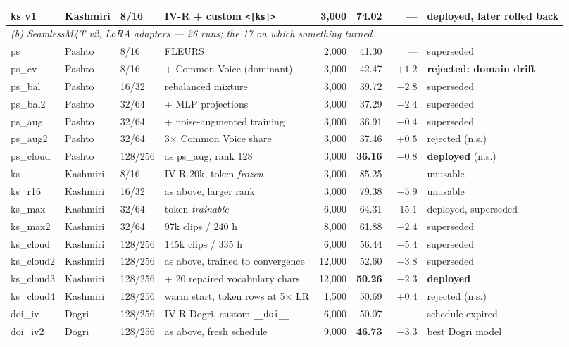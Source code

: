 \documentclass[sigconf,anonymous,review]{acmart}
\begin{document}
\begin{table}[t]
\begin{tabular}{llllrrrl}
ks v1 & Kashmiri & 8/16  & IV-R + custom \texttt{<|ks|>} & 3{,}000 & 74.02 & --- & deployed, later rolled back \\
\midrule
\multicolumn{8}{l}{\emph{(b) SeamlessM4T v2, LoRA adapters --- 26 runs; the 17 on which something turned}}\\
\midrule
ps        & Pashto   & 8/16   & FLEURS                       & 2{,}000 & 41.30 & ---    & superseded \\
ps\_cv    & Pashto   & 8/16   & + Common Voice (dominant)    & 3{,}000 & 42.47 & $+1.2$ & \textbf{rejected: domain drift} \\
ps\_bal   & Pashto   & 16/32  & rebalanced mixture           & 3{,}000 & 39.72 & $-2.8$ & superseded \\
ps\_bal2  & Pashto   & 32/64  & + MLP projections            & 3{,}000 & 37.29 & $-2.4$ & superseded \\
ps\_aug   & Pashto   & 32/64  & + noise-augmented training    & 3{,}000 & 36.91 & $-0.4$ & superseded \\
ps\_aug2  & Pashto   & 32/64  & 3$\times$ Common Voice share  & 3{,}000 & 37.46 & $+0.5$ & rejected (n.s.) \\
ps\_cloud & Pashto   & 128/256& as ps\_aug, rank 128         & 3{,}000 & \textbf{36.16} & $-0.8$ & \textbf{deployed} (n.s.) \\
\addlinespace
ks        & Kashmiri & 8/16   & IV-R 20k, token \emph{frozen} & 3{,}000 & 85.25 & ---    & unusable \\
ks\_r16   & Kashmiri & 16/32  & as above, larger rank        & 3{,}000 & 79.38 & $-5.9$ & unusable \\
ks\_max   & Kashmiri & 32/64  & token \emph{trainable}       & 6{,}000 & 64.31 & $-15.1$ & deployed, superseded \\
ks\_max2  & Kashmiri & 32/64  & 97k clips / 240 h            & 8{,}000 & 61.88 & $-2.4$ & superseded \\
ks\_cloud & Kashmiri & 128/256& 145k clips / 335 h           & 6{,}000 & 56.44 & $-5.4$ & superseded \\
ks\_cloud2& Kashmiri & 128/256& as above, trained to convergence & 12{,}000 & 52.60 & $-3.8$ & superseded \\
ks\_cloud3& Kashmiri & 128/256& + 20 repaired vocabulary chars & 12{,}000 & \textbf{50.26} & $-2.3$ & \textbf{deployed} \\
ks\_cloud4& Kashmiri & 128/256& warm start, token rows at 5$\times$ LR & 1{,}500 & 50.69 & $+0.4$ & rejected (n.s.) \\
\addlinespace
doi\_iv   & Dogri    & 128/256& IV-R Dogri, custom \texttt{\_\_doi\_\_} & 6{,}000 & 50.07 & --- & schedule expired \\
doi\_iv2  & Dogri    & 128/256& as above, fresh schedule     & 9{,}000 & \textbf{46.73} & $-3.3$ & best Dogri model \\
\bottomrule
\end{tabular}
\end{table}
\end{document}
